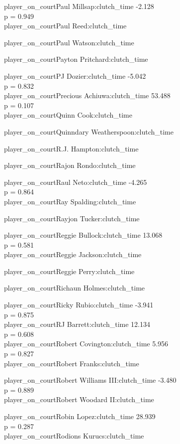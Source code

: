 \documentclass[
  landscape]{article}
\begin{document}
player\_on\_courtPaul Millsap:clutch\_time -2.128\\
p = 0.949\\
player\_on\_courtPaul Reed:clutch\_time

player\_on\_courtPaul Watson:clutch\_time

player\_on\_courtPayton Pritchard:clutch\_time

player\_on\_courtPJ Dozier:clutch\_time -5.042\\
p = 0.832\\
player\_on\_courtPrecious Achiuwa:clutch\_time 53.488\\
p = 0.107\\
player\_on\_courtQuinn Cook:clutch\_time

player\_on\_courtQuinndary Weatherspoon:clutch\_time

player\_on\_courtR.J. Hampton:clutch\_time

player\_on\_courtRajon Rondo:clutch\_time

player\_on\_courtRaul Neto:clutch\_time -4.265\\
p = 0.864\\
player\_on\_courtRay Spalding:clutch\_time

player\_on\_courtRayjon Tucker:clutch\_time

player\_on\_courtReggie Bullock:clutch\_time 13.068\\
p = 0.581\\
player\_on\_courtReggie Jackson:clutch\_time

player\_on\_courtReggie Perry:clutch\_time

player\_on\_courtRichaun Holmes:clutch\_time

player\_on\_courtRicky Rubio:clutch\_time -3.941\\
p = 0.875\\
player\_on\_courtRJ Barrett:clutch\_time 12.134\\
p = 0.608\\
player\_on\_courtRobert Covington:clutch\_time 5.956\\
p = 0.827\\
player\_on\_courtRobert Franks:clutch\_time

player\_on\_courtRobert Williams III:clutch\_time -3.480\\
p = 0.889\\
player\_on\_courtRobert Woodard II:clutch\_time

player\_on\_courtRobin Lopez:clutch\_time 28.939\\
p = 0.287\\
player\_on\_courtRodions Kurucs:clutch\_time
\end{document}
